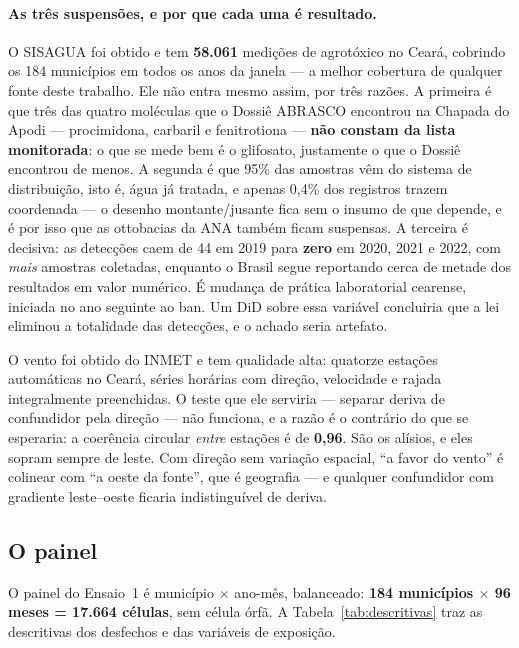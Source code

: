 \paragraph{As três suspensões, e por que cada uma é resultado.}
O SISAGUA foi obtido e tem \textbf{58.061} medições de agrotóxico no Ceará,
cobrindo os 184 municípios em todos os anos da janela --- a melhor cobertura de
qualquer fonte deste trabalho. Ele não entra mesmo assim, por três razões. A
primeira é que três das quatro moléculas que o Dossiê ABRASCO encontrou na
Chapada do Apodi --- procimidona, carbaril e fenitrotiona --- \textbf{não
constam da lista monitorada}: o que se mede bem é o glifosato, justamente o que
o Dossiê encontrou de menos. A segunda é que 95\% das amostras vêm do sistema de
distribuição, isto é, água já tratada, e apenas 0,4\% dos registros trazem
coordenada --- o desenho montante/jusante fica sem o insumo de que depende, e é
por isso que as ottobacias da ANA também ficam suspensas. A terceira é decisiva:
as detecções caem de 44 em 2019 para \textbf{zero} em 2020, 2021 e 2022, com
\emph{mais} amostras coletadas, enquanto o Brasil segue reportando cerca de
metade dos resultados em valor numérico. É mudança de prática laboratorial
cearense, iniciada no ano seguinte ao ban. Um DiD sobre essa variável concluiria
que a lei eliminou a totalidade das detecções, e o achado seria artefato.

O vento foi obtido do INMET e tem qualidade alta: quatorze estações automáticas
no Ceará, séries horárias com direção, velocidade e rajada integralmente
preenchidas. O teste que ele serviria --- separar deriva de confundidor pela
direção --- não funciona, e a razão é o contrário do que se esperaria: a
coerência circular \emph{entre} estações é de \textbf{0,96}. São os alísios, e
eles sopram sempre de leste. Com direção sem variação espacial, ``a favor do
vento'' é colinear com ``a oeste da fonte'', que é geografia --- e qualquer
confundidor com gradiente leste--oeste ficaria indistinguível de deriva.

\subsection{O painel}
\label{sub:painel}

O painel do Ensaio~1 é município \(\times\) ano-mês, balanceado: \textbf{184
municípios \(\times\) 96 meses = 17.664 células}, sem célula órfã. A
Tabela~\ref{tab:descritivas} traz as descritivas dos desfechos e das variáveis
de exposição.

